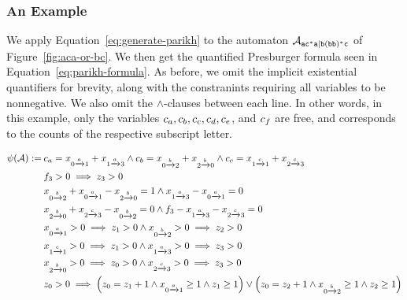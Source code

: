 \documentclass[acmsmall,review,anonymous,screen]{acmart}\settopmatter{printfolios=true,printccs=false,printacmref=true}
\theoremstyle{definition}
\begin{document}
\subsubsection{An Example}
We apply Equation~\ref{eq:generate-parikh} to the automaton $\mathcal{A}_{\mathtt{ac^*a|b(bb)^*c}}{}$ of Figure~\ref{fig:aca-or-bc}. We then get the quantified Presburger formula seen in Equation~\ref{eq:parikh-formula}. As before, we omit the implicit existential quantifiers for brevity, along with the constranints requiring all variables to be nonnegative. We also omit the $\land$-clauses between each line. In other words, in this example, only the variables $c_a, c_b, c_c, c_d, c_e$, and $c_f$ are free, and corresponds to the counts of the respective subscript letter.

\begin{equation}
  \begin{aligned}
  \ParikhMap(\Automaton):=\:
  &\LetterVar_{a} = \TransitionVar_{\FromLabelTo{0}{a}{1}} + \TransitionVar_{\FromLabelTo{1}{a}{3}} \land \LetterVar_{b} = \TransitionVar_{\FromLabelTo{0}{b}{2}} + \TransitionVar_{\FromLabelTo{2}{b}{0}} \land \LetterVar_{c} = \TransitionVar_{\FromLabelTo{1}{c}{1}} + \TransitionVar_{\FromLabelTo{2}{c}{3}}\\
  &\FinalStateVar_{3} > 0 \implies \StateVar_{3} > 0\\
  &\TransitionVar_{\FromLabelTo{0}{b}{2}} + \TransitionVar_{\FromLabelTo{0}{a}{1}} - \TransitionVar_{\FromLabelTo{2}{b}{0}} = 1 \land  \TransitionVar_{\FromLabelTo{1}{a}{3}} - \TransitionVar_{\FromLabelTo{0}{a}{1}} = 0\\
  & \TransitionVar_{\FromLabelTo{2}{b}{0}} + \TransitionVar_{\FromLabelTo{2}{c}{3}} - \TransitionVar_{\FromLabelTo{0}{b}{2}} = 0 \land \FinalStateVar_{3}  - \TransitionVar_{\FromLabelTo{1}{a}{3}} - \TransitionVar_{\FromLabelTo{2}{c}{3}} = 0\\
  &\TransitionVar_{\FromLabelTo{0}{a}{1}} > 0 \implies \StateVar_{1} > 0 \land \TransitionVar_{\FromLabelTo{0}{b}{2}} > 0 \implies \StateVar_{2} > 0\\
  &\TransitionVar_{\FromLabelTo{1}{c}{1}} > 0 \implies \StateVar_{1} > 0 \land \TransitionVar_{\FromLabelTo{1}{a}{3}} > 0 \implies \StateVar_{3} > 0\\
  &\TransitionVar_{\FromLabelTo{2}{b}{0}} > 0 \implies \StateVar_{0} > 0 \land \TransitionVar_{\FromLabelTo{2}{c}{3}} > 0 \implies \StateVar_{3} > 0\\
  &\StateVar_{0} > 0 \implies \left(\StateVar_{0} = \StateVar_{1} + 1 \land \TransitionVar_{\FromLabelTo{0}{a}{1}} \geq 1 \land \StateVar_{1} \geq 1\right) \lor \left(\StateVar_{0} = \StateVar_{2} + 1 \land \TransitionVar_{\FromLabelTo{0}{b}{2}} \geq 1 \land \StateVar_{2} \geq 1\right)\\

\end{aligned}
\end{equation}
\end{document}

